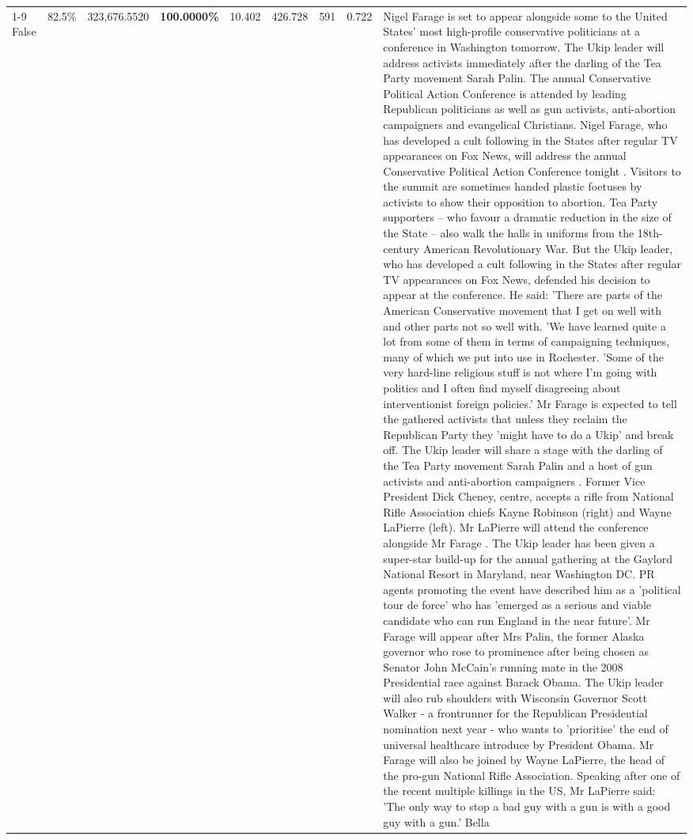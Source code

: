 \begin{table}[H]
\begin{tabular}{lllrlllll}
\cline{1-9}
False & 82.5\% & 323,676.5520 & \bfseries \color{red} 100.0000\% & 10.402 & 426.728 & 591 & 0.722 & Nigel Farage is set to appear alongside some to the United States' most high-profile conservative politicians at a conference in Washington tomorrow. The Ukip leader will address activists immediately after the darling of the Tea Party movement Sarah Palin. The annual Conservative Political Action Conference is attended by leading Republican politicians as well as gun activists, anti-abortion campaigners and evangelical Christians. Nigel Farage, who has developed a cult following in the States after regular TV appearances on Fox News, will address the annual Conservative Political Action Conference tonight . Visitors to the summit are sometimes handed plastic foetuses by activists to show their opposition to abortion. Tea Party supporters – who favour a dramatic reduction in the size of the State – also walk the halls in uniforms from the 18th-century American Revolutionary War. But the Ukip leader, who has developed a cult following in the States after regular TV appearances on Fox News, defended his decision to appear at the conference. He said: 'There are parts of the American Conservative movement that I get on well with and other parts not so well with. 'We have learned quite a lot from some of them in terms of campaigning techniques, many of which we put into use in Rochester. 'Some of the very hard-line religious stuff is not where I'm going with politics and I often find myself disagreeing about interventionist foreign policies.' Mr Farage is expected to tell the gathered activists that unless they reclaim the Republican Party they 'might have to do a Ukip' and break off. The Ukip leader will share a stage with the darling of the Tea Party movement Sarah Palin and a host of gun activists and anti-abortion campaigners . Former Vice President Dick Cheney, centre, accepts a rifle from National Rifle Association chiefs Kayne Robinson (right) and Wayne LaPierre (left). Mr LaPierre will attend the conference alongside Mr Farage . The Ukip leader has been given a super-star build-up for the annual gathering at the Gaylord National Resort in Maryland, near Washington DC. PR agents promoting the event have described him as a 'political tour de force' who has 'emerged as a serious and viable candidate who can run England in the near future'. Mr Farage will appear after Mrs Palin, the former Alaska governor who rose to prominence after being chosen as Senator John McCain's running mate in the 2008 Presidential race against Barack Obama. The Ukip leader will also rub shoulders with Wisconsin Governor Scott Walker - a frontrunner for the Republican Presidential nomination next year - who wants to 'prioritise' the end of universal healthcare introduce by President Obama. Mr Farage will also be joined by Wayne LaPierre, the head of the pro-gun National Rifle Association. Speaking after one of the recent multiple killings in the US, Mr LaPierre said: 'The only way to stop a bad guy with a gun is with a good guy with a gun.' Bella \\

\end{tabular}
\end{table}
